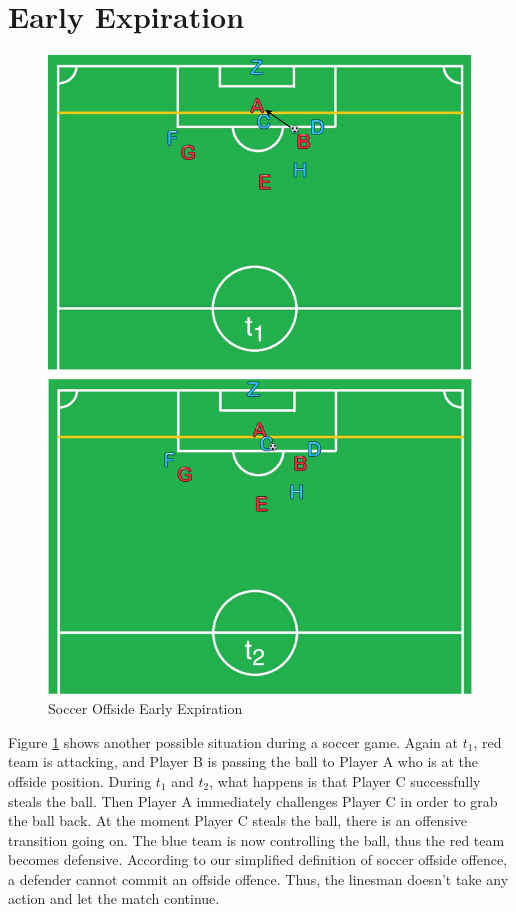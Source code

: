 \section{Early Expiration}

\begin{figure}[!htbp]
	\centering
	\includegraphics[width=5in]{img/1-seex.pdf}
	\caption{Soccer Offside Early Expiration}
	\label{fig:1-seex} 
\end{figure}

Figure \ref{fig:1-seex} shows another possible situation during a soccer game. 
Again at $t_{1}$, red team is attacking, and Player B is passing the ball to Player A who is at the offside position.
During $t_{1}$ and $t_{2}$, what happens is that Player C successfully steals the ball.
Then Player A immediately challenges Player C in order to grab the ball back. 
At the moment Player C steals the ball, there is an offensive transition going on.
The blue team is now controlling the ball, thus the red team becomes defensive. 
According to our simplified definition of soccer offside offence, a defender cannot commit an offside offence. 
Thus, the linesman doesn't take any action and let the match continue. 

